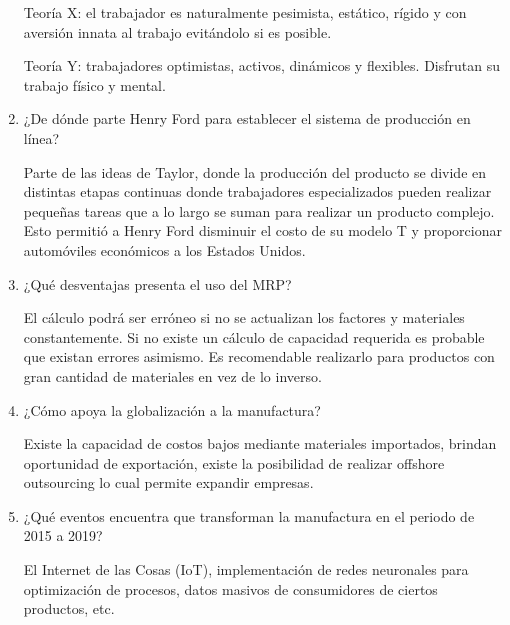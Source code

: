\documentclass[12pt, letterpaper]{article}
\begin{document}
\begin{enumerate}
		Teoría X: el trabajador es naturalmente pesimista, estático, rígido y con aversión innata al trabajo evitándolo si es posible.

		Teoría Y: trabajadores optimistas, activos, dinámicos y flexibles. Disfrutan su trabajo físico y mental.

	\item ¿De dónde parte Henry Ford para establecer el sistema de producción en línea?

		Parte de las ideas de Taylor, donde la producción del producto se divide en distintas etapas continuas donde trabajadores especializados pueden realizar pequeñas tareas que a lo largo se suman para realizar un producto complejo. Esto permitió a Henry Ford disminuir el costo de su modelo T y proporcionar automóviles económicos a los Estados Unidos.

	\item ¿Qué desventajas presenta el uso del MRP?

		El cálculo podrá ser erróneo si no se actualizan los factores y materiales constantemente. Si no existe un cálculo de capacidad requerida es probable que existan errores asimismo. Es recomendable realizarlo para productos con gran cantidad de materiales en vez de lo inverso.

	\item ¿Cómo apoya la globalización a la manufactura?

		Existe la capacidad de costos bajos mediante materiales importados, brindan oportunidad de exportación, existe la posibilidad de realizar offshore outsourcing lo cual permite expandir empresas.

	\item ¿Qué eventos encuentra que transforman la manufactura en el periodo de 2015 a 2019?

		El Internet de las Cosas (IoT), implementación de redes neuronales para optimización de procesos, datos masivos de consumidores de ciertos productos, etc.

\end{enumerate}

\renewcommand\refname{References}
\printbibliography
\end{document}

